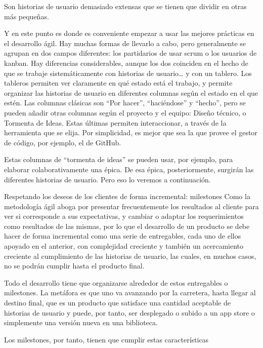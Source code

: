 Son historias de usuario demasiado extensas que se tienen 
que dividir en otras más pequeñas.

Y en este punto es donde es conveniente empezar a usar las 
mejores prácticas en el desarrollo ágil. Hay muchas formas 
de llevarlo a cabo, pero generalmente se agrupan en dos 
campos diferentes: los partidarios de usar scrum o los 
usuarios de kanban. Hay diferencias considerables, aunque 
los dos coinciden en el hecho de que se trabaje sistemáticamente 
con historias de usuario… y con un tablero. Los tableros permiten 
ver claramente en qué estado está el trabajo, y permite organizar 
las historias de usuario en diferentes columnas según el estado 
en el que estén. Las columnas clásicas son “Por hacer”, 
“haciéndose” y “hecho”, pero se pueden añadir otras columnas 
según el proyecto y el equipo: Diseño técnico, o Tormenta 
de Ideas. Estas últimas permiten interaccionar, a través 
de la herramienta que se elija. Por simplicidad, es 
mejor que sea la que provee el gestor de código, por ejemplo, el de GitHub.

Estas columnas de “tormenta de ideas” se pueden usar, por ejemplo, 
para elaborar colaborativamente una épica. De esa épica, 
posteriormente, surgirán las diferentes historias de usuario. 
Pero eso lo veremos a continuación.

Respetando los deseos de los clientes de forma incremental: milestones
Como la metodología ágil aboga por presentar frecuentemente 
los resultados al cliente para ver si corresponde a sus 
expectativas, y cambiar o adaptar los requerimientos como 
resultados de las mismas, por lo que el desarrollo de un 
producto se debe hacer de forma incremental como una serie 
de entregables, cada uno de ellos apoyado en el anterior, 
con complejidad creciente y también un acercamiento creciente 
al cumplimiento de las historias de usuario, las cuales, en muchos 
casos, no se podrán cumplir hasta el producto final.

Todo el desarrollo tiene que organizarse alrededor de estos 
entregables o milestones. La metáfora es que uno va avanzando 
por la carretera, hasta llegar al destino final, que es un 
producto que satisface una cantidad aceptable de historias 
de usuario y puede, por tanto, ser desplegado o subido a un 
app store o simplemente una versión nueva en una biblioteca.

Los milestones, por tanto, tienen que cumplir estas características

